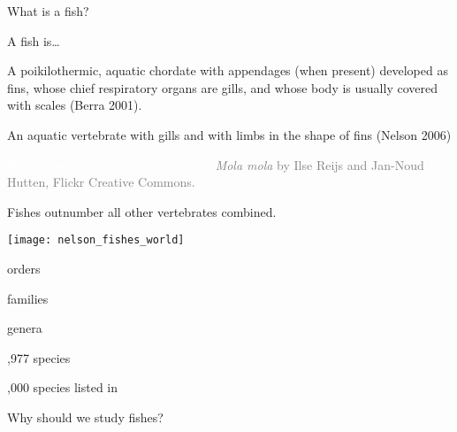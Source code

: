 \documentclass[t]{beamer}
\begin{document}
{
\begin{frame}[t,plain]{What is a fish?}
\end{frame}
}


\begin{frame}[t,plain]{A fish is\dots}

	\hangpara A poikilothermic, aquatic chordate with appendages (when present) developed as fins, whose chief respiratory organs are gills, and whose body is usually covered with scales (Berra 2001).

	\hangpara An aquatic vertebrate with gills and with limbs in the shape of fins (Nelson 2006)

\end{frame}

{
\begin{frame}[b,plain]{\textcolor{white}{How many species of fishes are there?}}
	\hfill\tiny\textcolor{gray}{\textit{Mola mola} by Ilse Reijs and Jan-Noud Hutten, Flickr Creative Commons.}
\end{frame}
}

\begin{frame}[t,plain]{Fishes outnumber all other vertebrates combined.}
\begin{multicols}{2}
	\begin{center}
		\texttt{[image: nelson\_fishes\_world]} \\
	\end{center}
	
	\columnbreak
	
	 orders

	 families
		
	 genera
		
	,977 species
	
	,000 species listed in {\small{}}
		
\end{multicols}
\end{frame}

{
\begin{frame}[t,plain]{Why should we study fishes?}
\end{frame}
}
\end{document}
